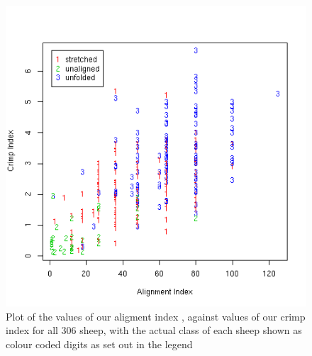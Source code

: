 %

\begin{figure}[!h]
  \centering
  \includegraphics[width=1.1\textwidth]{figalign_crimp.png}
  \caption{Plot of the values of our aligment index , against values of our crimp index  for all 306 sheep, with the actual class of each sheep shown as colour coded digits as set out in the legend}
  \label{fig:align_crimp}
\end{figure}

%

